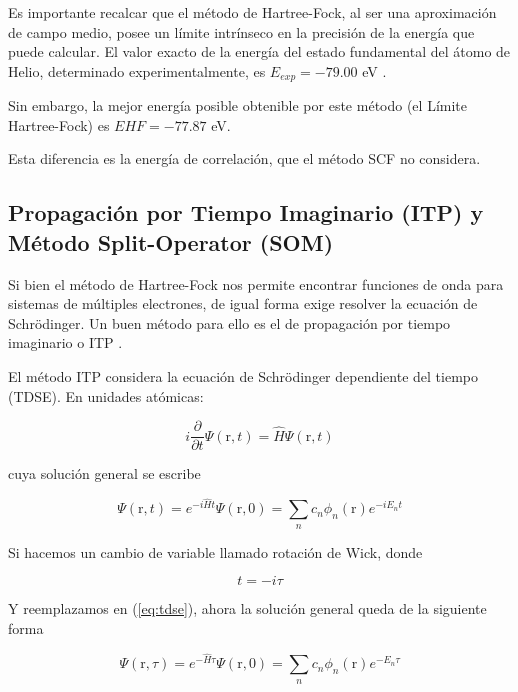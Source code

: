 \documentclass[aps,twocolumn,preprintnumbers]{revtex4}
\begin{document}
  Es importante recalcar que el método de Hartree-Fock, al ser una aproximación de campo medio, posee un límite intrínseco en la precisión de la energía que puede calcular. El valor exacto de la energía del estado fundamental del átomo de Helio, determinado experimentalmente, es $E_{exp} = -79.00$ eV \cite{nist}.

  Sin embargo, la mejor energía posible obtenible por este método (el Límite Hartree-Fock) es $E{HF} =-77.87$ eV.

  Esta diferencia es la energía de correlación, que el método SCF no considera.

  \subsection{Propagación por Tiempo Imaginario (ITP) y Método Split-Operator (SOM)}

  Si bien el método de Hartree-Fock nos permite encontrar funciones de onda para sistemas de múltiples electrones, de igual forma exige resolver la ecuación de Schrödinger. Un buen método para ello es el de propagación por tiempo imaginario o ITP \cite{lehtovaara}.

  El método ITP considera la ecuación de Schrödinger dependiente del tiempo (TDSE). En unidades atómicas:

  \begin{equation}\label{eq:tdse}
    i \frac{\partial}{\partial t}\Psi(\bm{\mathrm{r}}, t) = \hat{H}\Psi(\bm{\mathrm{r}}, t)
  \end{equation}

  cuya solución general se escribe

  \begin{equation}
    \Psi(\bm{\mathrm{r}}, t) = e^{-i\hat{H}t}\Psi(\bm{\mathrm{r}}, 0) =\sum_n c_n \phi_n(\bm{\mathrm{r}})e^{-iE_nt}
  \end{equation}

  Si hacemos un cambio de variable llamado rotación de Wick, donde

  \begin{equation}
    t = -i\tau
  \end{equation}

  Y reemplazamos en (\ref{eq:tdse}), ahora la solución general queda de la siguiente forma

  \begin{equation}
    \Psi(\bm{\mathrm{r}}, \tau) = e^{-\hat{H}\tau}\Psi(\bm{\mathrm{r}}, 0) =\sum_n c_n \phi_n(\bm{\mathrm{r}})e^{-E_n\tau}
  \end{equation}
\end{document}
